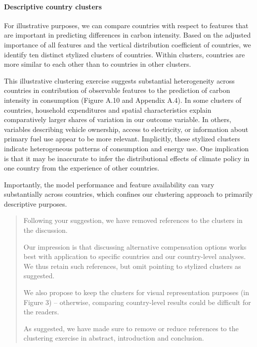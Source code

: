\documentclass[11pt]{article}
\newenvironment{response}
{\begin{quote}\color{black}}
{\end{quote}}
\begin{document}
\begin{revisionbox}
    \paragraph{Descriptive country clusters}
    For illustrative purposes, we can compare countries with respect to features that are important in predicting differences in carbon intensity. Based on the adjusted importance of all features and the vertical distribution coefficient of countries, we identify ten distinct stylized clusters of countries. Within clusters, countries are more similar to each other than to countries in other clusters. 
    
    This illustrative clustering exercise suggests substantial heterogeneity across countries in contribution of observable features to the prediction of carbon intensity in consumption (Figure A.10 and Appendix A.4). In some clusters of countries, household expenditures and spatial characteristics explain comparatively larger shares of variation in our outcome variable. In others, variables describing vehicle ownership, access to electricity, or information about primary fuel use appear to be more relevant. Implicitly, these stylized clusters indicate heterogeneous patterns of consumption and energy use. One implication is that it may be inaccurate to infer the distributional effects of climate policy in one country from the experience of other countries.

    Importantly, the model performance and feature availability can vary substantially across countries, which confines our clustering approach to primarily descriptive purposes.
\end{revisionbox}

\begin{response}
    Following your suggestion, we have removed references to the clusters in the discussion. 

    Our impression is that discussing alternative compensation options works best with application to specific countries and our country-level analyses. We thus retain such references, but omit pointing to stylized clusters as suggested. 
    
    We also propose to keep the clusters for visual representation purposes (in Figure 3) -- otherwise, comparing country-level results could be difficult for the readers.
    
    As suggested, we have made sure to remove or reduce references to the clustering exercise in abstract, introduction and conclusion.
\end{response}
\end{document}
